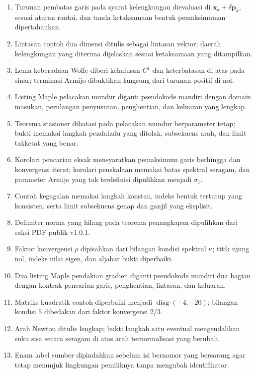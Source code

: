 \documentclass[a4paper,openany,leqno,fleqn,12pt]{amsbook}
\numberwithin{equation}{chapter}
\numberwithin{figure}{chapter}
\theoremstyle{definition}
\theoremstyle{remark}
\begin{document}
\begin{enumerate}
  \item Turunan pembatas garis pada syarat kelengkungan dievaluasi di
  $\mathbf{x}_k+\delta\mathbf{p}_k$, sesuai aturan rantai, dan tanda
  ketaksamaan bentuk pemaksimuman dipertahankan.
  \item Lintasan contoh dua dimensi ditulis sebagai lintasan vektor; daerah
  kelengkungan yang diterima dijelaskan sesuai ketaksamaan yang ditampilkan.
  \item Lema keberadaan Wolfe diberi kehalusan $C^1$ dan keterbatasan di atas
  pada sinar; terminasi Armijo dibuktikan langsung dari turunan positif di nol.
  \item Listing Maple pelacakan mundur diganti pseudokode mandiri dengan domain
  masukan, perulangan penyusutan, penghentian, dan keluaran yang lengkap.
  \item Teorema stasioner dibatasi pada pelacakan mundur berparameter tetap;
  bukti memakai langkah pendahulu yang ditolak, subsekuens arah, dan limit
  takketat yang benar.
  \item Korolari pencarian eksak mensyaratkan pemaksimum garis berhingga dan
  konvergensi iterat; korolari penskalaan memakai batas spektral seragam, dan
  parameter Armijo yang tak terdefinisi dipulihkan menjadi $\sigma_1$.
  \item Contoh kegagalan memakai langkah konstan, indeks bentuk tertutup yang
  konsisten, serta limit subsekuens genap dan ganjil yang eksplisit.
  \item Delimiter norma yang hilang pada teorema penangkapan dipulihkan dari
  saksi PDF publik v1.0.1.
  \item Faktor konvergensi $\rho$ dipisahkan dari bilangan kondisi spektral
  $\kappa$; titik ujung nol, indeks nilai eigen, dan aljabar bukti diperbaiki.
  \item Dua listing Maple pendakian gradien diganti pseudokode mandiri dua
  bagian dengan kontrak pencarian garis, penghentian, lintasan, dan keluaran.
  \item Matriks kuadratik contoh diperbaiki menjadi
  $\operatorname{diag}(-4,-20)$; bilangan kondisi $5$ dibedakan dari faktor
  konvergensi $2/3$.
  \item Arah Newton ditulis lengkap; bukti langkah satu eventual mengendalikan
  suku sisa secara seragam di atas arah ternormalisasi yang berubah.
  \item Enam label sumber dipindahkan sebelum isi bernomor yang bersarang agar
  tetap menunjuk lingkungan pemiliknya tanpa mengubah identifikator.
\end{enumerate}
\end{document}
